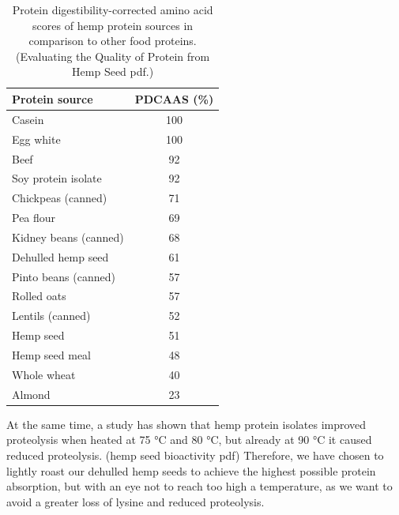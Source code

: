 \begin{table}[h]
    \centering
    \caption{Protein digestibility-corrected amino acid scores of hemp protein sources in comparison to other food proteins. (Evaluating the Quality of Protein from Hemp Seed pdf.)}
    \label{tab:process_table_01}
    \begin{tabular}{l c}
    \hline
    \textbf{Protein source} & \textbf{PDCAAS (\%)} \\
    \hline
    Casein               & 100 \\
    Egg white            & 100 \\
    Beef                 & 92  \\
    Soy protein isolate  & 92  \\
    Chickpeas (canned)   & 71  \\
    Pea flour            & 69  \\
    Kidney beans (canned)& 68  \\
    Dehulled hemp seed   & 61  \\
    Pinto beans (canned) & 57  \\
    Rolled oats          & 57  \\
    Lentils (canned)     & 52  \\
    Hemp seed            & 51  \\
    Hemp seed meal       & 48  \\
    Whole wheat          & 40  \\
    Almond               & 23  \\
    \hline
    \end{tabular}
\end{table}

\vspace{1em}
At the same time, a study has shown that hemp protein isolates improved proteolysis when heated at 75 °C and 80 °C, but already at 90 °C it caused reduced proteolysis. (hemp seed bioactivity pdf) Therefore, we have chosen to lightly roast our dehulled hemp seeds to achieve the highest possible protein absorption, but with an eye not to reach too high a temperature, as we want to avoid a greater loss of lysine and reduced proteolysis.

